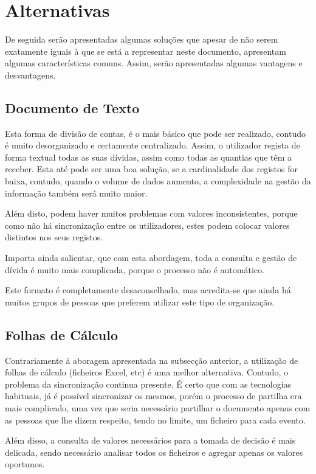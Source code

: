 \section{Alternativas}

De seguida serão apresentadas algumas soluções que apesar de não serem exatamente iguais à que se está a representar neste documento, apresentam algumas características comuns. Assim, serão apresentadas algumas vantagens e desvantagens.

\subsection{Documento de Texto}

Esta forma de divisão de contas, é o mais básico que pode ser realizado, contudo é muito desorganizado e certamente centralizado. Assim, o utilizador regista de forma textual todas as suas dívidas, assim como todas as quantias que têm a receber. Esta até pode ser uma boa solução, se a cardinalidade dos registos for baixa, contudo, quando o volume de dados aumento, a complexidade na gestão da informação também será muito maior.

Além disto, podem haver muitos problemas com valores inconsistentes, porque como não há sincronização entre os utilizadores, estes podem colocar valores distintos nos seus registos.

Importa ainda salientar, que com esta abordagem, toda a consulta e gestão de dívida é muito mais complicada, porque o processo não é automático.

Este formato é completamente desaconselhado, mas acredita-se que ainda há muitos grupos de pessoas que preferem utilizar este tipo de organização.

\subsection{Folhas de Cálculo}

Contrariamente à aboragem apresentada na subsecção anterior, a utilização de folhas de cálculo (ficheiros Excel, etc) é uma melhor alternativa. Contudo, o problema da sincronização continua presente. É certo que com as tecnologias habituais, já é possível sincronizar os mesmos, porém o processo de partilha era mais complicado, uma vez que seria necessário partilhar o documento apenas com as pessoas que lhe dizem respeito, tendo no limite, um ficheiro para cada evento.

Além disso, a consulta de valores necessários para a tomada de decisão é mais delicada, sendo necessário analisar todos os ficheiros e agregar apenas os valores oportunos.

